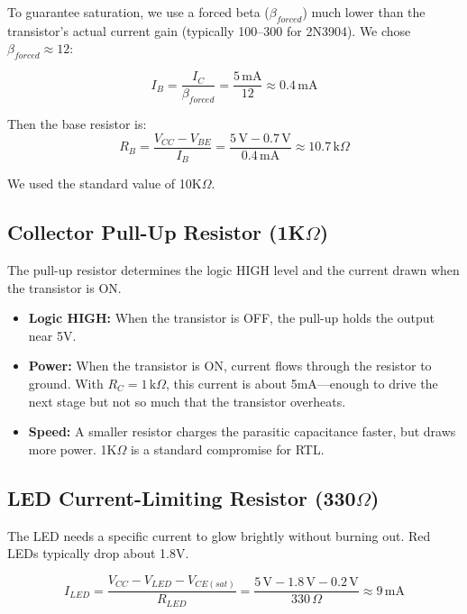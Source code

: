 \documentclass[11pt,a4paper]{article}
\begin{document}
To guarantee saturation, we use a forced beta ($\beta_{forced}$) much lower than the transistor's actual current gain (typically 100--300 for 2N3904). We chose $\beta_{forced} \approx 12$:

\begin{equation}
I_B = \frac{I_C}{\beta_{forced}} = \frac{5\,\text{mA}}{12} \approx 0.4\,\text{mA}
\end{equation}

Then the base resistor is:
\begin{equation}
R_B = \frac{V_{CC} - V_{BE}}{I_B} = \frac{5\,\text{V} - 0.7\,\text{V}}{0.4\,\text{mA}} \approx 10.7\,\text{k}\Omega
\end{equation}

We used the standard value of 10K$\Omega$.
\subsection{Collector Pull-Up Resistor (1K$\Omega$)}

The pull-up resistor determines the logic HIGH level and the current drawn when the transistor is ON.

\begin{itemize}[leftmargin=2em]
  \item \textbf{Logic HIGH:} When the transistor is OFF, the pull-up holds the output near 5V.
  \item \textbf{Power:} When the transistor is ON, current flows through the resistor to ground. With $R_C = 1\,\text{k}\Omega$, this current is about 5mA---enough to drive the next stage but not so much that the transistor overheats.
  \item \textbf{Speed:} A smaller resistor charges the parasitic capacitance faster, but draws more power. 1K$\Omega$ is a standard compromise for RTL.
\end{itemize}

\subsection{LED Current-Limiting Resistor (330$\Omega$)}

The LED needs a specific current to glow brightly without burning out. Red LEDs typically drop about 1.8V.

\begin{equation}
I_{LED} = \frac{V_{CC} - V_{LED} - V_{CE(sat)}}{R_{LED}} = \frac{5\,\text{V} - 1.8\,\text{V} - 0.2\,\text{V}}{330\,\Omega} \approx 9\,\text{mA}
\end{equation}
\end{document}
